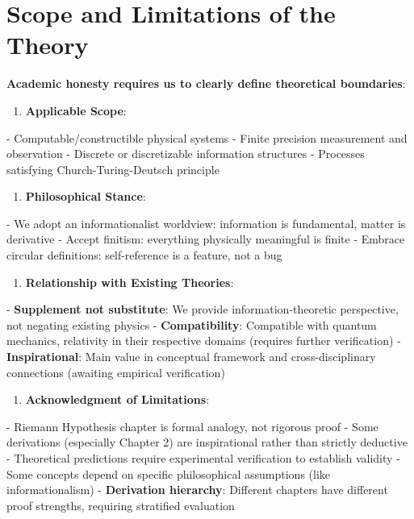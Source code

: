 \section{Scope and Limitations of the Theory}
\label{sec:ch06_conclusion:scope-and-limitations-of-the-theory}

\textbf{Academic honesty requires us to clearly define theoretical boundaries}:

\begin{enumerate}
\item \textbf{Applicable Scope}:
\end{enumerate}
   - Computable/constructible physical systems
   - Finite precision measurement and observation
   - Discrete or discretizable information structures
   - Processes satisfying Church-Turing-Deutsch principle

\begin{enumerate}
\item \textbf{Philosophical Stance}:
\end{enumerate}
   - We adopt an informationalist worldview: information is fundamental, matter is derivative
   - Accept finitism: everything physically meaningful is finite
   - Embrace circular definitions: self-reference is a feature, not a bug

\begin{enumerate}
\item \textbf{Relationship with Existing Theories}:
\end{enumerate}
   - \textbf{Supplement not substitute}: We provide information-theoretic perspective, not negating existing physics
   - \textbf{Compatibility}: Compatible with quantum mechanics, relativity in their respective domains (requires further verification)
   - \textbf{Inspirational}: Main value in conceptual framework and cross-disciplinary connections (awaiting empirical verification)

\begin{enumerate}
\item \textbf{Acknowledgment of Limitations}:
\end{enumerate}
   - Riemann Hypothesis chapter is formal analogy, not rigorous proof
   - Some derivations (especially Chapter 2) are inspirational rather than strictly deductive
   - Theoretical predictions require experimental verification to establish validity
   - Some concepts depend on specific philosophical assumptions (like informationalism)
   - \textbf{Derivation hierarchy}: Different chapters have different proof strengths, requiring stratified evaluation

